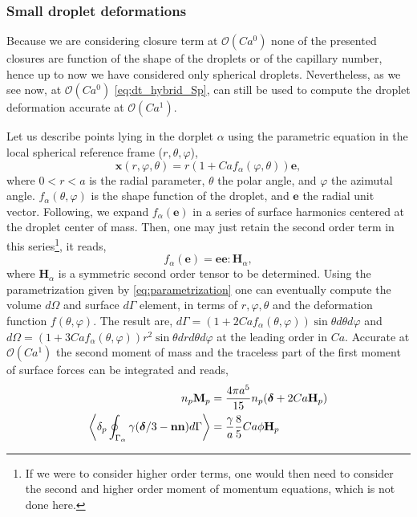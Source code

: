 \subsubsection{Small droplet deformations}

Because we are considering closure term at $\mathcal{O}(Ca^0)$ none of the presented closures are function of the shape of the droplets or of the capillary number, hence up to now we have considered only spherical droplets. 
Nevertheless, as we  see now, at $\mathcal{O}(Ca^0)$ \ref{eq:dt_hybrid_Sp}, can still be used to compute the droplet deformation accurate at $\mathcal{O}(Ca^1)$. 

Let us describe points lying in the dorplet $\alpha$ using the parametric equation in the local spherical reference frame ($r,\theta,\varphi$),
\begin{equation}
    \textbf{x}(r,\varphi,\theta) = r (1+ Ca f_\alpha(\varphi,\theta)) \textbf{e},
    \label{eq:parametrization}
\end{equation}
where $0<r<a$ is the radial parameter, $\theta$ the polar angle, and $\varphi$ the azimutal angle. 
$f_\alpha(\theta,\varphi)$ is the shape function of the droplet, and $\textbf{e}$ the radial unit vector. 
Following, \citet{nadim1996concise,nadim1991motion} we expand $f_\alpha(\textbf{e})$ in a series of surface harmonics centered at the droplet center of mass. 
Then, one may just retain the second order term in this series\footnote{If we were to consider higher order terms, one would then need to consider the second and higher order moment of momentum equations, which is not done here.}, it reads,
\begin{equation}
    f_\alpha(\textbf{e}) = 
    \textbf{ee}:\textbf{H}_\alpha,
\end{equation} 
where $\textbf{H}_\alpha$ is a symmetric second order tensor to be determined\citep{nadim1991motion}. 
Using the parametrization given by \ref{eq:parametrization} one can eventually compute the volume $d\Omega$ and surface $d\Gamma$ element, in terms of $r,\varphi,\theta$ and the deformation function $f(\theta,\varphi)$.
The result are, $d\Gamma = (1+2Ca f_\alpha(\theta,\varphi)) \sin\theta d\theta d\varphi$ and $d\Omega = (1+3Ca f_\alpha(\theta,\varphi)) r^2\sin\theta drd\theta d\varphi$ at the leading order in $Ca$. 
Accurate at $\mathcal{O}(Ca^1)$ the second moment of mass and the traceless part of the first moment of surface forces can be integrated and reads,  
\begin{align}
    \label{eq:second_moment_of_mass}
    n_p \textbf{M}_p &= \frac{4\pi a^5}{15}n_p(\bm\delta+2Ca \textbf{H}_p) \\
    \pSavg{\gamma (\bm\delta/3 - \textbf{nn})} &=\frac{\gamma}{a}\frac{8}{5} Ca \phi \textbf{H}_p
    \label{eq:closure_surface_tension}
\end{align}
